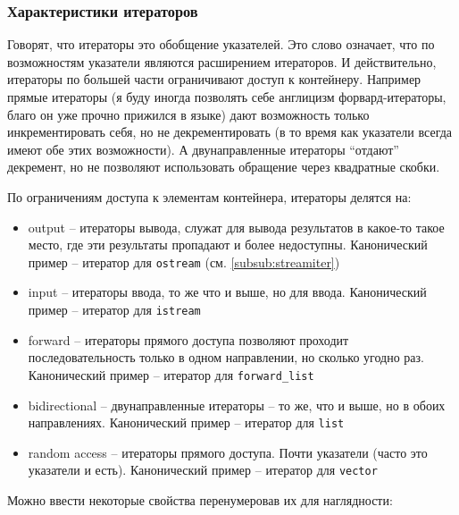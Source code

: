 \documentclass[a4paper,12pt,oneside]{article}
\newif\ifanswers
\begin{document}
\ifanswers
Тут нет единого рецепта: если важно гарантировать константную сложность или ошибку компиляции тогда разностью. А если важно, чтобы всегда работало, тогда вспомогательной функцией.
\fi

\subsubsection{Характеристики итераторов}\label{subsub:itertraits}

Говорят, что итераторы это обобщение указателей. Это слово означает, что по возможностям указатели являются расширением итераторов. И действительно, итераторы по большей части ограничивают доступ к контейнеру. Например прямые итераторы (я буду иногда позволять себе англицизм форвард-итераторы, благо он уже прочно прижился в языке) дают возможность только инкрементировать себя, но не декрементировать (в то время как указатели всегда имеют обе этих возможности). А двунаправленные итераторы ``отдают'' декремент, но не позволяют использовать обращение через квадратные скобки.

По ограничениям доступа к элементам контейнера, итераторы делятся на:

\begin {itemize}
\item output -- итераторы вывода, служат для вывода результатов в какое-то такое место, где эти результаты пропадают и более недоступны. Канонический пример -- итератор для \lstinline!ostream! (см. \ref{subsub:streamiter})
\item input -- итераторы ввода, то же что и выше, но для ввода. Канонический пример -- итератор для \lstinline!istream!
\item forward -- итераторы прямого доступа позволяют проходит последовательность только в одном направлении, но сколько угодно раз. Канонический пример -- итератор для \lstinline!forward_list!
\item bidirectional -- двунаправленные итераторы -- то же, что и выше, но в обоих направлениях. Канонический пример -- итератор для \lstinline!list!
\item random access -- итераторы прямого доступа. Почти указатели (часто это указатели и есть). Канонический пример -- итератор для \lstinline!vector!
\end {itemize}

Можно ввести некоторые свойства перенумеровав их для наглядности:
\end{document}
